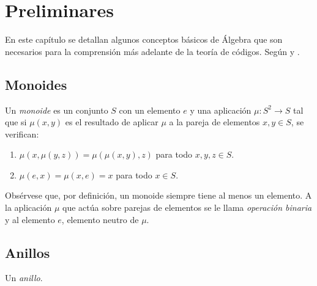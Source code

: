 \chapter{Preliminares}

En este capítulo se detallan algunos conceptos básicos de Álgebra que son necesarios para la comprensión más adelante de la teoría de códigos. Según \parencite{cohn_algebra_1982} y \parencite{cohn_algebra_1989}.

\section{Monoides}

\begin{definition}
  Un \textit{monoide} es un conjunto \(S\) con un elemento \(e\) y una aplicación \(\mu: S^2 \to S\) tal que si \(\mu(x, y)\) es el resultado de aplicar \(\mu\) a la pareja de elementos \(x, y \in S\), se verifican: \begin{enumerate}
    \item \(\mu(x, \mu(y, z)) = \mu(\mu(x, y), z)\) para todo \(x, y, z \in S\).
    \item \(\mu(e, x) = \mu(x, e) = x\) para todo \(x \in S\).
  \end{enumerate}
\end{definition}

Obsérvese que, por definición, un monoide siempre tiene al menos un elemento. A la aplicación \(\mu\) que actúa sobre parejas de elementos se le llama \textit{operación binaria} y al elemento \(e\), elemento neutro de \(\mu\).

\section{Anillos}

\begin{definition}
  Un \textit{anillo}.
\end{definition}